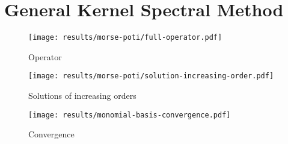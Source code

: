 \chapter{General Kernel Spectral Method}
\label{chap:general-kernel-spectral-method}



\begin{figure}[H]
  \centering
  \label{fig:morse-operator}
  \texttt{[image: results/morse-poti/full-operator.pdf]}
  \caption{Operator}
\end{figure}

\begin{figure}[H]
  \centering
  \label{fig:morse-solution-increasing-order}
  \texttt{[image: results/morse-poti/solution-increasing-order.pdf]}
  \caption{Solutions of increasing orders}
\end{figure}

\begin{figure}[H]
  \centering
  \label{fig:monomial-basis-convergence}
  \texttt{[image: results/monomial-basis-convergence.pdf]}
  \caption{Convergence}
\end{figure}
